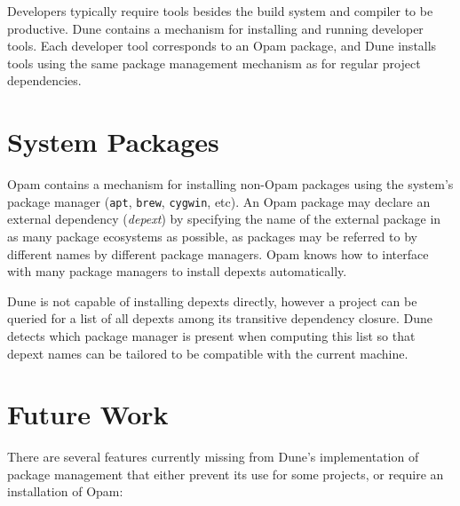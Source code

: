 \documentclass{article}
\begin{document}
\begin{multicols}{2}
        Developers typically require tools besides the build system and compiler
        to be productive. Dune contains a mechanism for installing and running
        developer tools. Each developer tool corresponds to an Opam package, and
        Dune installs tools using the same package management mechanism as for
        regular project dependencies.

        \section {System Packages}

        Opam contains a mechanism for installing non-Opam packages using the
        system's package manager (\texttt{apt}, \texttt{brew}, \texttt{cygwin},
        etc). An Opam package may declare an external dependency
        (\textit{depext}) by specifying the name of the external package in as
        many package ecosystems as possible, as packages may be referred to by
        different names by different package managers. Opam knows how to
        interface with many package managers to install depexts automatically.

        Dune is not capable of installing depexts directly, however a project
        can be queried for a list of all depexts among its transitive dependency
        closure. Dune detects which package manager is present when computing
        this list so that depext names can be tailored to be compatible with
        the current machine.

        \section {Future Work}

        There are several features currently missing from Dune's implementation
        of package management that either prevent its use for some projects, or
        require an installation of Opam:


\end{multicols}
\end{document}
